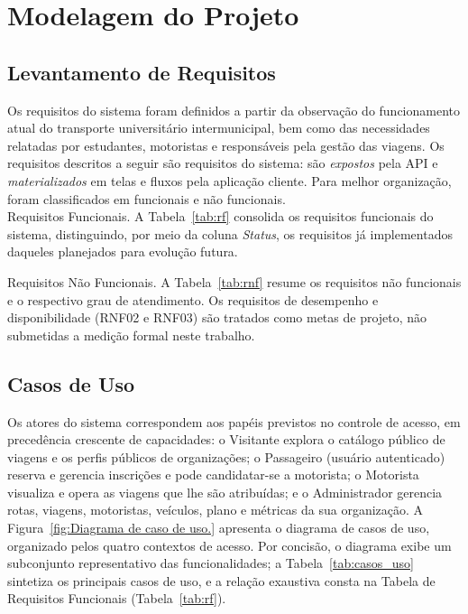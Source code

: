 \documentclass[12pt,openright,oneside,a4paper]{article}
\begin{document}



\section{Modelagem do Projeto}
\label{sec:modelagem}

\subsection{Levantamento de Requisitos}
Os requisitos do sistema foram definidos a partir da observação do funcionamento atual do transporte universitário intermunicipal, bem como das necessidades relatadas por estudantes, motoristas e responsáveis pela gestão das viagens. Os requisitos descritos a seguir são requisitos do sistema: são \textit{expostos} pela API e \textit{materializados} em telas e fluxos pela aplicação cliente. Para melhor organização, foram classificados em funcionais e não funcionais. \\
Requisitos Funcionais. A Tabela~\ref{tab:rf} consolida os requisitos funcionais do sistema, distinguindo, por meio da coluna \textit{Status}, os requisitos já implementados daqueles planejados para evolução futura.



Requisitos Não Funcionais. A Tabela~\ref{tab:rnf} resume os requisitos não funcionais e o respectivo grau de atendimento. Os requisitos de desempenho e disponibilidade (RNF02 e RNF03) são tratados como metas de projeto, não submetidas a medição formal neste trabalho.



\subsection{Casos de Uso}

Os atores do sistema correspondem aos papéis previstos no controle de acesso, em precedência crescente de capacidades: o Visitante explora o catálogo público de viagens e os perfis públicos de organizações; o Passageiro (usuário autenticado) reserva e gerencia inscrições e pode candidatar-se a motorista; o Motorista visualiza e opera as viagens que lhe são atribuídas; e o Administrador gerencia rotas, viagens, motoristas, veículos, plano e métricas da sua organização. A Figura~\ref{fig:Diagrama de caso de uso.} apresenta o diagrama de casos de uso, organizado pelos quatro contextos de acesso. Por concisão, o diagrama exibe um subconjunto representativo das funcionalidades; a Tabela~\ref{tab:casos_uso} sintetiza os principais casos de uso, e a relação exaustiva consta na Tabela de Requisitos Funcionais (Tabela~\ref{tab:rf}).
\end{document}
